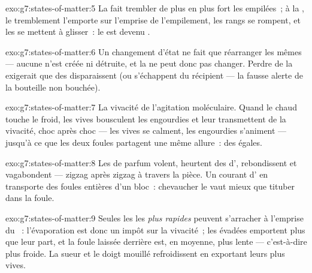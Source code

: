 \begin{solution}{exo:g7:states-of-matter:5}
La  fait trembler de plus en plus fort les 
empilées~; à la , le tremblement l'emporte sur
l'emprise de l'empilement, les rangs se rompent, et les  se
mettent à glisser~: le  est devenu .
\end{solution}

\begin{solution}{exo:g7:states-of-matter:6}
Un changement d'état ne fait que réarranger les mêmes  ---
aucune n'est créée ni détruite, et la  ne peut donc pas changer.
Perdre de la  exigerait que des  disparaissent (ou
s'échappent du récipient --- la fausse alerte de la bouteille non
bouchée).
\end{solution}

\begin{solution}{exo:g7:states-of-matter:7}
La vivacité de l'agitation moléculaire. Quand le chaud touche le
froid, les  vives bousculent les engourdies et leur
transmettent de la vivacité, choc après choc --- les vives se
calment, les engourdies s'animent --- jusqu'à ce que les deux foules
partagent une même allure~: des  égales.
\end{solution}

\begin{solution}{exo:g7:states-of-matter:8}
Les  de parfum volent, heurtent des  d',
rebondissent et vagabondent --- zigzag après zigzag à travers la
pièce. Un courant d' en transporte des foules entières d'un
bloc~: chevaucher le  vaut mieux que tituber dans la foule.
\end{solution}

\begin{solution}{exo:g7:states-of-matter:9}
Seules les  les \emph{plus rapides} peuvent s'arracher à
l'emprise du ~: l'évaporation est donc un impôt sur la
vivacité~; les évadées emportent plus que leur part, et la foule
laissée derrière est, en moyenne, plus lente --- c'est-à-dire plus
froide. La sueur et le doigt mouillé refroidissent en exportant leurs
plus vives.
\end{solution}

